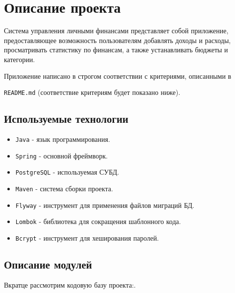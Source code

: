 \documentclass[a4paper, 14pt]{article}
\begin{document}
\iffalse
\section{Описание проекта}

Система управления личными финансами представляет собой приложение, предоставляющее возможность пользователям добавлять доходы и расходы, просматривать статистику по финансам, а также устанавливать бюджеты и категории.

Приложение написано в строгом соответствии с критериями, описанными в

\texttt{README.md} (соответствие критериям будет показано ниже).

\subsection{Используемые технологии}

\begin{itemize}
	\item \texttt{Java} - язык программирования.
	\item \texttt{Spring} - основной фреймворк.
	\item \texttt{PostgreSQL} - используемая СУБД.
	\item \texttt{Maven} - система сборки проекта.
	\item \texttt{Flyway} - инструмент для применения файлов миграций БД.
	\item \texttt{Lombok} - библиотека для сокращения шаблонного кода.
	\item \texttt{Bcrypt} - инструмент для хеширования паролей.
\end{itemize}

\subsection{Описание модулей}

Вкратце рассмотрим кодовую базу проекта:.
\end{document}
